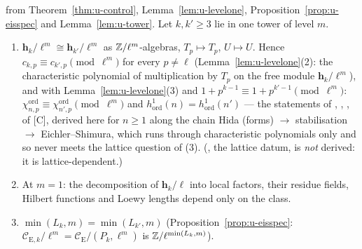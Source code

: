 \documentclass[11pt]{article}
\newcommand{\hcusp}{\mathbf{h}}                   %
\newcommand{\Pk}[1]{P_{#1}}                       %
\newcommand{\Eis}{\mathrm{E}}
\newcommand{\Cg}{\mathcal{C}}                     %
\begin{document}
\begin{proposition}\label{prop:u-determines}
\PROVED{} from Theorem~\ref{thm:u-control}, Lemma~\ref{lem:u-levelone}, Proposition~\ref{prop:u-eisspec} and Lemma~\ref{lem:u-tower}.
Let $k,k'\ge3$ lie in one tower of level $m$.
\begin{enumerate}
\item $\hcusp_k/\ell^{m}\cong\hcusp_{k'}/\ell^{m}$ as $\mathbb{Z}/\ell^{m}$-algebras, $T_p\mapsto T_p$, $U\mapsto U$. Hence
  $c_{k,p}\equiv c_{k',p}\pmod{\ell^{m}}$ for every $p\ne\ell$ (Lemma~\ref{lem:u-levelone}(2): the characteristic polynomial of
  multiplication by $T_p$ on the free module $\hcusp_k/\ell^{m}$), and with Lemma~\ref{lem:u-levelone}(3) and $1+p^{k-1}\equiv1+p^{k'-1}
  \pmod{\ell^{m}}$: $\chi^{\mathrm{ord}}_{n,p}\equiv\chi^{\mathrm{ord}}_{n',p}\pmod{\ell^{m}}$ and $h^{1}_{\mathrm{ord}}(n)=h^{1}_{\mathrm{ord}}(n')$
  --- the statements of , , ,  of [C], derived here for $n\ge1$ along the chain Hida
  (forms) $\to$ stabilisation $\to$ Eichler--Shimura, which runs through characteristic polynomials only and so never meets the
  lattice question of (3). (, the lattice datum, is \emph{not} derived: it is lattice-dependent.)
\item At $m=1$: the decomposition of $\hcusp_k/\ell$ into local factors, their residue fields, Hilbert functions and Loewy lengths
  depend only on the class.
\item $\min(L_k,m)=\min(L_{k'},m)$ (Proposition~\ref{prop:u-eisspec}: $\Cg_{\Eis,k}/\ell^{m}=\Cg_\Eis/(\Pk{k},\ell^{m})$ is
  $\mathbb{Z}/\ell^{\min(L_k,m)}$).
\end{enumerate}
\end{proposition}
\end{document}
